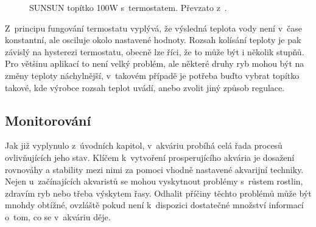         \begin{figure}[h!]
            \centering

            \caption{SUNSUN topítko 100W s~termostatem. Převzato z~\cite{eshop-rostlinna-akvaria}.}
            \label{fig:obrazky-topeni-topitko-jpg}
        \end{figure}
        
        Z~principu fungování termostatu vyplývá, že výsledná teplota vody není v~čase konstantní, ale osciluje okolo nastavené hodnoty. Rozsah kolísání teploty je pak závislý na hysterezi termostatu, obecně lze říci, že to může být i několik stupňů. Pro většinu aplikací to není velký problém, ale některé druhy ryb mohou být na změny teploty náchylnější, v~takovém případě je potřeba buďto vybrat topítko takové, kde výrobce rozsah teplot uvádí, anebo zvolit jiný způsob regulace. 

    \subsection{Monitorování}
    \label{sec:monitorovani}
        Jak již vyplynulo z~úvodních kapitol, v~akváriu probíhá celá řada procesů ovlivňujících jeho stav. Klíčem k~vytvoření prosperujícího akvária je dosažení rovnováhy a stability mezi nimi za pomoci vhodně nastavené akvarijní techniky. Nejen u~začínajících akvaristů se mohou vyskytnout problémy s~růstem rostlin, zdravím ryb nebo třeba výskytem řasy. Odhalit příčiny těchto problémů může být mnohdy obtížné, ovzláště pokud není k~dispozici dostatečné množství informací o~tom, co se v~akváriu děje. 
        
